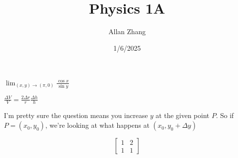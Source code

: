 \documentclass[hidelinks]{article}
\title{\textbf{Physics 1A}}
\author{Allan Zhang}
\date{1/6/2025}
\begin{document}
\hypersetup{bookmarksnumbered=true,}
\pagecolor{white}
\color{black}
\maketitle


%

$\lim_{(x, y)\to(\pi, 0)}{\frac{\cos x}{\sin y}}$

$\frac{\Delta V}{V} = \frac{2 \Delta r}{r}\frac{\Delta h}{h}$

I'm pretty sure the question means you increase $y$ at the given point $P$. So if $P = (x_0, y_0)$, we're looking at what happens at $(x_0, y_0 + \Delta y)$ 


\[\begin{bmatrix} 
1 & 2 \\ 1 & 1 
\end{bmatrix}
\]
\end{document}
